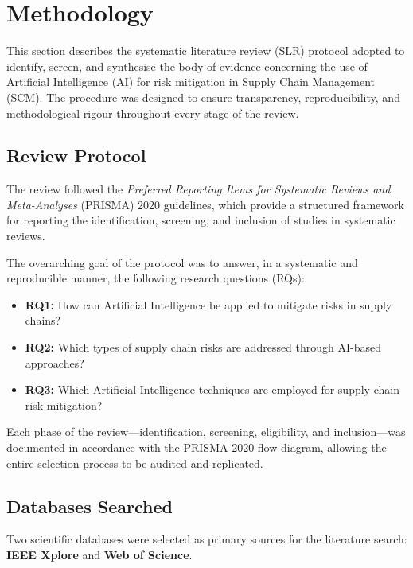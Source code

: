 \section{Methodology}
\label{sec:methodology}

This section describes the systematic literature review (SLR) protocol adopted to identify, screen, and synthesise the body of evidence concerning the use of Artificial Intelligence (AI) for risk mitigation in Supply Chain Management (SCM). The procedure was designed to ensure transparency, reproducibility, and methodological rigour throughout every stage of the review.

\subsection{Review Protocol}
\label{subsec:protocol}

The review followed the \textit{Preferred Reporting Items for Systematic Reviews and Meta-Analyses} (PRISMA) 2020 guidelines, which provide a structured framework for reporting the identification, screening, and inclusion of studies in systematic reviews.

The overarching goal of the protocol was to answer, in a systematic and reproducible manner, the following research questions (RQs):

\begin{itemize}
    \item \textbf{RQ1:} How can Artificial Intelligence be applied to mitigate risks in supply chains?
    \item \textbf{RQ2:} Which types of supply chain risks are addressed through AI-based approaches?
    \item \textbf{RQ3:} Which Artificial Intelligence techniques are employed for supply chain risk mitigation?
\end{itemize}

Each phase of the review---identification, screening, eligibility, and inclusion---was documented in accordance with the PRISMA 2020 flow diagram, allowing the entire selection process to be audited and replicated.

\subsection{Databases Searched}
\label{subsec:databases}

Two scientific databases were selected as primary sources for the literature search: \textbf{IEEE Xplore} and \textbf{Web of Science}.

